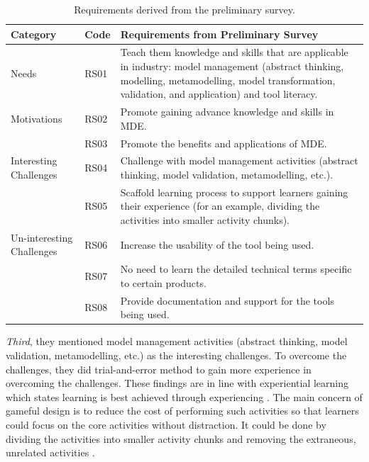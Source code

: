 \documentclass[12pt, a4paper]{report} \usepackage[titletoc]{appendix}
\begin{document}
\begin{appendices}
\begin{table}[ht]
\caption{Requirements derived from the preliminary survey.}
\label{table:preliminary-survey}
\begin{center}
\begin{tabular}{ p{2cm}p{1cm}p{10cm} } 
\hline
Category & Code & Requirements from Preliminary Survey \\
\hline
\multirow{1}{2cm}{Needs} 
& RS01 & Teach them knowledge and skills that are applicable in industry: model management (abstract thinking, modelling, metamodelling, model transformation, validation, and application) and tool literacy. \\ 
\hline
\multirow{1}{2cm}{Motivations}
& RS02 & Promote gaining advance knowledge and skills in MDE. \\ 
& RS03 & Promote the benefits and applications of MDE. \\ 
\hline
\multirow{1}{2cm}{Interesting Challenges}
& RS04 & Challenge with model management activities (abstract thinking, model validation, metamodelling, etc.). \\ 
& RS05 & Scaffold learning process to support learners gaining their experience (for an example, dividing the activities into smaller activity chunks). \\ 
\hline
\multirow{1}{2cm}{Un-interesting Challenges}
& RS06 & Increase the usability of the tool being used. \\ 
& RS07 & No need to learn the detailed technical terms specific to certain products. \\ 
& RS08 & Provide documentation and support for the tools being used. \\ 
\hline
\end{tabular}
\end{center}
\end{table}

\textit{Third}, they mentioned model management activities (abstract thinking, model validation, metamodelling, etc.) as the interesting challenges. To overcome the challenges, they did trial-and-error method to gain more experience in overcoming the challenges. These findings are in line with experiential learning which states learning is best achieved through experiencing \cite{kolb2014experiential}. The main concern of gameful design is to reduce the cost of performing such activities so that learners could focus on the core activities without distraction. It could be done by dividing the activities into smaller activity chunks and removing the extraneous, unrelated activities \cite{deterding2015lens}. 


\end{appendices}
\end{document}

